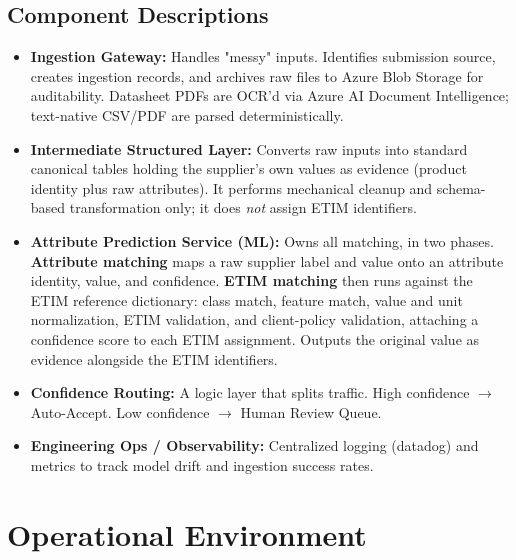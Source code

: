 \documentclass[12pt, a4paper]{article}
\begin{document}
\subsection{Component Descriptions}
\begin{itemize}
    \item \textbf{Ingestion Gateway:} Handles "messy" inputs. Identifies submission source, creates ingestion records, and archives raw files to Azure Blob Storage for auditability. Datasheet PDFs are OCR'd via Azure AI Document Intelligence; text-native CSV/PDF are parsed deterministically.
    \item \textbf{Intermediate Structured Layer:} Converts raw inputs into standard canonical tables holding the supplier's own values as evidence (product identity plus raw attributes). It performs mechanical cleanup and schema-based transformation only; it does \emph{not} assign ETIM identifiers.
    \item \textbf{Attribute Prediction Service (ML):} Owns all matching, in two phases. \textbf{Attribute matching} maps a raw supplier label and value onto an attribute identity, value, and confidence. \textbf{ETIM matching} then runs against the ETIM reference dictionary: class match, feature match, value and unit normalization, ETIM validation, and client-policy validation, attaching a confidence score to each ETIM assignment. Outputs the original value as evidence alongside the ETIM identifiers.
    \item \textbf{Confidence Routing:} A logic layer that splits traffic. High confidence $\rightarrow$ Auto-Accept. Low confidence $\rightarrow$ Human Review Queue.
    \item \textbf{Engineering Ops / Observability:} Centralized logging (datadog) and metrics to track model drift and ingestion success rates.
\end{itemize}

\newpage
\section{Operational Environment}
\end{document}
